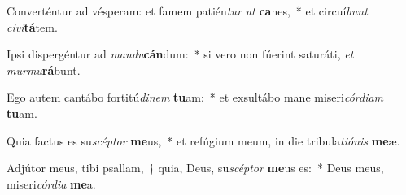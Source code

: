 \item Converténtur ad vésperam: et famem patién\textit{tur} \textit{ut} \textbf{ca}nes,~* et circuí\textit{bunt} \textit{ci}\textit{vi}\textbf{tá}tem.
\item Ipsi dispergéntur ad \textit{man}\textit{du}\textbf{cán}dum:~* si vero non fúerint saturáti, \textit{et} \textit{mur}\textit{mu}\textbf{rá}bunt.
\item Ego autem cantábo fortitú\textit{di}\textit{nem} \textbf{tu}am:~* et exsultábo mane miseri\textit{cór}\textit{di}\textit{am} \textbf{tu}am.
\item Quia factus es su\textit{scép}\textit{tor} \textbf{me}us,~* et refúgium meum, in die tribula\textit{ti}\textit{ó}\textit{nis} \textbf{me}æ.
\item Adjútor meus, tibi psallam,~† quia, Deus, su\textit{scép}\textit{tor} \textbf{me}us es:~* Deus meus, miseri\textit{cór}\textit{di}\textit{a} \textbf{me}a.
